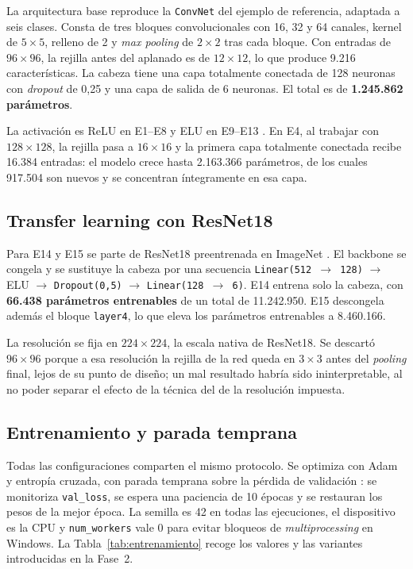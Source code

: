 \documentclass[11pt,a4paper]{article}
\begin{document}
La arquitectura base reproduce la \texttt{ConvNet} del ejemplo de referencia, adaptada a seis clases. Consta de tres bloques convolucionales con 16, 32 y 64 canales, kernel de $5\times5$, relleno de 2 y \emph{max pooling} de $2\times2$ tras cada bloque. Con entradas de $96\times96$, la rejilla antes del aplanado es de $12\times12$, lo que produce 9.216 características. La cabeza tiene una capa totalmente conectada de 128 neuronas con \emph{dropout} de 0,25 \citep{srivastava2014dropout} y una capa de salida de 6 neuronas. El total es de \textbf{1.245.862 parámetros}.

La activación es ReLU en E1--E8 y ELU en E9--E13 \citep{clevert2016fast}. En E4, al trabajar con $128\times128$, la rejilla pasa a $16\times16$ y la primera capa totalmente conectada recibe 16.384 entradas: el modelo crece hasta 2.163.366 parámetros, de los cuales 917.504 son nuevos y se concentran íntegramente en esa capa.

\subsection{Transfer learning con ResNet18}

Para E14 y E15 se parte de ResNet18 preentrenada en ImageNet \citep{he2016deep,deng2009imagenet}. El backbone se congela y se sustituye la cabeza por una secuencia \texttt{Linear(512 $\rightarrow$ 128)} $\rightarrow$ ELU $\rightarrow$ \texttt{Dropout(0,5)} $\rightarrow$ \texttt{Linear(128 $\rightarrow$ 6)}. E14 entrena solo la cabeza, con \textbf{66.438 parámetros entrenables} de un total de 11.242.950. E15 descongela además el bloque \texttt{layer4}, lo que eleva los parámetros entrenables a 8.460.166.

La resolución se fija en $224\times224$, la escala nativa de ResNet18. Se descartó $96\times96$ porque a esa resolución la rejilla de la red queda en $3\times3$ antes del \emph{pooling} final, lejos de su punto de diseño; un mal resultado habría sido ininterpretable, al no poder separar el efecto de la técnica del de la resolución impuesta.

\subsection{Entrenamiento y parada temprana}

Todas las configuraciones comparten el mismo protocolo. Se optimiza con Adam \citep{kingma2015adam} y entropía cruzada, con parada temprana sobre la pérdida de validación \citep{prechelt1998early}: se monitoriza \texttt{val\_loss}, se espera una paciencia de 10 épocas y se restauran los pesos de la mejor época. La semilla es 42 en todas las ejecuciones, el dispositivo es la CPU y \texttt{num\_workers} vale 0 para evitar bloqueos de \emph{multiprocessing} en Windows. La Tabla~\ref{tab:entrenamiento} recoge los valores y las variantes introducidas en la Fase~2.
\end{document}
